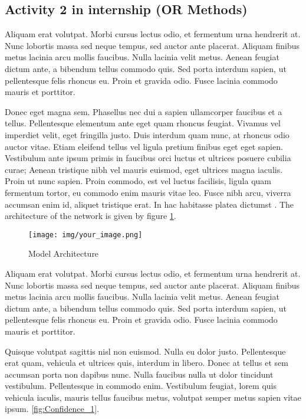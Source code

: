 \documentclass[11pt]{article}
\begin{document}
\subsection{Activity 2 in internship (OR Methods)}

Aliquam erat volutpat. Morbi cursus lectus odio, et fermentum urna hendrerit at. Nunc lobortis massa sed neque tempus, sed auctor ante placerat. Aliquam finibus metus lacinia arcu mollis faucibus. Nulla lacinia velit metus. Aenean feugiat dictum ante, a bibendum tellus commodo quis. Sed porta interdum sapien, ut pellentesque felis rhoncus eu. Proin et gravida odio. Fusce lacinia commodo mauris et porttitor.

Donec eget magna sem. Phasellus nec dui a sapien ullamcorper faucibus et a tellus. Pellentesque elementum ante eget quam rhoncus feugiat. Vivamus vel imperdiet velit, eget fringilla justo. Duis interdum quam nunc, at rhoncus odio auctor vitae. Etiam eleifend tellus vel ligula pretium finibus eget eget sapien. Vestibulum ante ipsum primis in faucibus orci luctus et ultrices posuere cubilia curae; Aenean tristique nibh vel mauris euismod, eget ultrices magna iaculis. Proin ut nunc sapien. Proin commodo, est vel luctus facilisis, ligula quam fermentum tortor, eu commodo enim mauris vitae leo. Fusce nibh arcu, viverra accumsan enim id, aliquet tristique erat. In hac habitasse platea dictumst \cite{hendrycks2019using}. The architecture of the network is given by figure \ref{fig:model}.


\begin{figure}[H]
    \centering
    \texttt{[image: img/your\_image.png]}
    \caption{Model Architecture}
    \label{fig:model}
\end{figure}


Aliquam erat volutpat. Morbi cursus lectus odio, et fermentum urna hendrerit at. Nunc lobortis massa sed neque tempus, sed auctor ante placerat. Aliquam finibus metus lacinia arcu mollis faucibus. Nulla lacinia velit metus. Aenean feugiat dictum ante, a bibendum tellus commodo quis. Sed porta interdum sapien, ut pellentesque felis rhoncus eu. Proin et gravida odio. Fusce lacinia commodo mauris et porttitor.

Quisque volutpat sagittis nisl non euismod. Nulla eu dolor justo. Pellentesque erat quam, vehicula et ultrices quis, interdum in libero. Donec at tellus et sem accumsan porta non dapibus nunc. Nulla faucibus nulla ut dolor tincidunt vestibulum. Pellentesque in commodo enim. Vestibulum feugiat, lorem quis vehicula iaculis, mauris tellus faucibus metus, volutpat semper metus sapien vitae ipsum. \ref{fig:Confidence_1}. 
\end{document}
